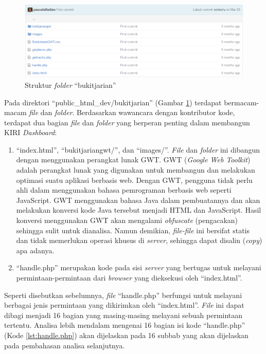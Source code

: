 \begin{figure}[htbp]
	\centering
		\includegraphics[scale=0.5]{Gambar/3_bukit_jarian.png}
	\caption{Struktur \textit{folder} ``bukitjarian''}
	\label{fig:3_bukit_jarian}
\end{figure}

Pada direktori ``public\_html\_dev/bukitjarian'' (Gambar \ref{fig:3_bukit_jarian}) terdapat bermacam-macam \textit{file} dan \textit{folder}. Berdasarkan wawancara dengan kontributor kode, terdapat dua bagian \textit{file} dan \textit{folder} yang berperan penting dalam membangun KIRI \textit{Dashboard}:
\begin{enumerate}
	\item ``index.html'', ``bukitjariangwt/'', dan ``images/''. \textit{File} dan \textit{folder} ini dibangun dengan menggunakan perangkat lunak GWT. GWT (\textit{Google Web Toolkit}) adalah perangkat lunak yang digunakan untuk membangun dan melakukan optimasi suatu aplikasi berbasis web\cite{gwt}. Dengan GWT, pengguna tidak perlu ahli dalam menggunakan bahasa pemrograman berbasis web seperti JavaScript. GWT menggunakan bahasa Java dalam pembuatannya dan akan melakukan konversi kode Java tersebut menjadi HTML dan JavaScript. Hasil konversi menggunakan GWT akan mengalami \textit{obfuscate} (pengacakan) sehingga sulit untuk dianalisa. Namun demikian, \textit{file-file} ini bersifat statis dan tidak memerlukan operasi khusus di \textit{server}, sehingga dapat disalin (\textit{copy}) apa adanya. 
	\item ``handle.php'' merupakan kode pada sisi \textit{server} yang bertugas untuk melayani permintaan-permintaan dari \textit{browser} yang dieksekusi oleh ``index.html''.
\end{enumerate}

Seperti disebutkan sebelumnya, \textit{file} ``handle.php'' berfungsi untuk melayani berbagai jenis permintaan yang dikirimkan oleh ``index.html''. \textit{File} ini dapat dibagi menjadi 16 bagian yang masing-masing melayani sebuah permintaan tertentu. Analisa lebih mendalam mengenai 16 bagian isi kode ``handle.php'' (Kode \ref{lst:handle.php}) akan dijelaskan pada 16 subbab yang akan dijelaskan pada pembahasan analisa selanjutnya.

